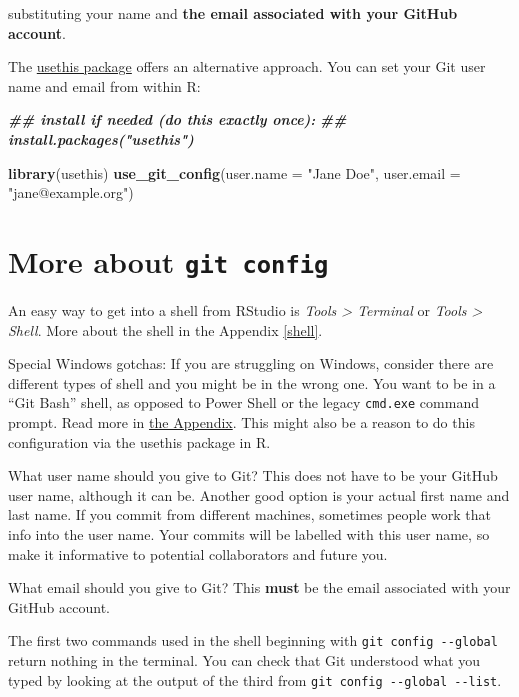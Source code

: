 \documentclass[
]{book}
\newenvironment{Shaded}{\begin{snugshade}}{\end{snugshade}}
\newcommand{\AttributeTok}[1]{\textcolor[rgb]{0.13,0.29,0.53}{#1}}
\newcommand{\DocumentationTok}[1]{\textcolor[rgb]{0.56,0.35,0.01}{\textbf{\textit{#1}}}}
\newcommand{\FunctionTok}[1]{\textcolor[rgb]{0.13,0.29,0.53}{\textbf{#1}}}
\newcommand{\NormalTok}[1]{#1}
\newcommand{\StringTok}[1]{\textcolor[rgb]{0.31,0.60,0.02}{#1}}
\begin{document}
substituting your name and \textbf{the email associated with your GitHub account}.

The \href{https://usethis.r-lib.org}{usethis package} offers an alternative approach. You can set your Git user name and email from within R:

\begin{Shaded}
\begin{Highlighting}[]
\DocumentationTok{\#\# install if needed (do this exactly once):}
\DocumentationTok{\#\# install.packages("usethis")}

\FunctionTok{library}\NormalTok{(usethis)}
\FunctionTok{use\_git\_config}\NormalTok{(}\AttributeTok{user.name =} \StringTok{"Jane Doe"}\NormalTok{, }\AttributeTok{user.email =} \StringTok{"jane@example.org"}\NormalTok{)}
\end{Highlighting}
\end{Shaded}

\section{\texorpdfstring{More about \texttt{git\ config}}{More about git config}}\label{more-about-git-config}

An easy way to get into a shell from RStudio is \emph{Tools \textgreater{} Terminal} or \emph{Tools \textgreater{} Shell}. More about the shell in the Appendix \ref{shell}.

Special Windows gotchas: If you are struggling on Windows, consider there are different types of shell and you might be in the wrong one. You want to be in a ``Git Bash'' shell, as opposed to Power Shell or the legacy \texttt{cmd.exe} command prompt. Read more in \hyperref[windows-shell-hell]{the Appendix}. This might also be a reason to do this configuration via the usethis package in R.

What user name should you give to Git? This does not have to be your GitHub user name, although it can be. Another good option is your actual first name and last name. If you commit from different machines, sometimes people work that info into the user name. Your commits will be labelled with this user name, so make it informative to potential collaborators and future you.

What email should you give to Git? This \textbf{must} be the email associated with your GitHub account.

The first two commands used in the shell beginning with \texttt{git\ config\ -\/-global} return nothing in the terminal. You can check that Git understood what you typed by looking at the output of the third from \texttt{git\ config\ -\/-global\ -\/-list}.
\end{document}
